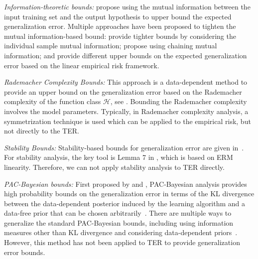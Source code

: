 \documentclass{article}
\theoremstyle{plain}
\theoremstyle{plain}
\theoremstyle{definition}
\theoremstyle{remark}
\begin{document}
\textit{Information-theoretic bounds:} %
\citet{russo2019much,xu2017information} propose using the 
mutual information between the input training set and the output hypothesis to upper bound the expected generalization error. Multiple approaches have been proposed to tighten the mutual information-based bound: \citet{bu2020tightening} provide tighter bounds by considering the individual sample mutual information; \citet{asadi2018chaining,asadi2020chaining} propose using chaining mutual information;  and \citet{steinke2020reasoning,hafez2020conditioning,aminian2020jensen,aminian2021information} provide different upper bounds on the expected generalization error based on the linear empirical risk framework. 

\textit{Rademacher Complexity Bounds:} This approach is a data-dependent method to provide an upper bound on the generalization error based on the Rademacher complexity of the function class $\mathcal{H}$, see \citep{bartlett2002rademacher,Golowich18a}. Bounding the Rademacher complexity involves the model parameters. Typically, in Rademacher complexity analysis, %
a symmetrization technique is used which can be applied to the empirical risk, but not directly to the TER. %

\textit{Stability Bounds:} %
Stability-based bounds for generalization error are given in~\citet{Bousquet-Elisseeff, bousquet/klochkov/zhivotovskiy:2020,mou2017generalization,chen2018stability,aminian2023mean}. For stability analysis, the key tool is Lemma 7 in \citet{bousquet2002stability}, which is based on ERM linearity. Therefore, we can not apply stability analysis to TER directly.

\textit{PAC-Bayesian bounds:} First proposed by \citet{shawe1997pac,mcallester1999some} and \citet{mcallester2003pac}, PAC-Bayesian analysis provides high probability bounds on the generalization error in terms of the KL divergence between the data-dependent posterior induced by the learning algorithm and a data-free prior that can be chosen arbitrarily~\citep{alquier2021user}. There are multiple ways to generalize the standard PAC-Bayesian bounds, including using %
information measures other than KL divergence \citep{alquier2018simpler,begin2016pac,hellstrom2020generalization,aminian2021information} and considering data-dependent priors~\citep{rivasplata2020pac,catoni2007pac,dziugaite2018entropy,ambroladze2007tighter}. However, this method has not been applied to TER to provide generalization error bounds.
\end{document}
